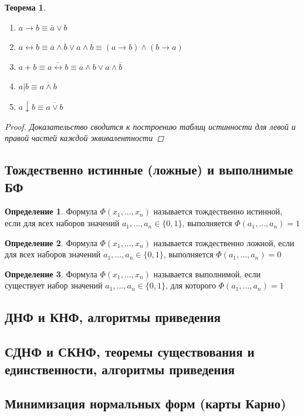 \documentclass[a4paper]{article}
\newtheorem{theorem}{Теорема}[section]
\theoremstyle{definition}
\newtheorem*{definition}{Определение}
\theoremstyle{remark}
\begin{document}
\begin{theorem}
\begin{enumerate}
			\item $a \rightarrow b \equiv \overline{a} \vee b$
			\item $a \leftrightarrow b \equiv \overline{a} \wedge \overline{b} \vee a \wedge b \equiv (a \rightarrow b) \wedge (b \rightarrow a)$
			\item $a + b \equiv \overline{a \leftrightarrow b} \equiv \overline{a} \wedge b \vee a \wedge \overline{b}$
			\item $a | b \equiv \overline{a \wedge b}$
			\item $a \downarrow b \equiv \overline{a \vee b}$
		\end{enumerate}
		\begin{proof}
			Доказательство сводится к построению таблиц истинности для левой и правой частей каждой эквивалентности
		\end{proof}
	\end{theorem}
    \subsection{Тождественно истинные (ложные) и выполнимые БФ}
	\begin{definition}
		Формула $\Phi(x_1, ..., x_n)$ называется тождественно истинной, если для всех наборов значений $a_1, ..., a_n \in \{0, 1\}$, выполняется $\Phi(a_1, ..., a_n) = 1$
	\end{definition}
	\begin{definition}
		Формула $\Phi(x_1, ..., x_n)$ называется тождественно ложной, если для всех наборов значений $a_1, ..., a_n \in \{0, 1\}$, выполняется $\Phi(a_1, ..., a_n) = 0$
	\end{definition}
	\begin{definition}
		Формула $\Phi(x_1, ..., x_n)$ называется выполнимой, если существует набор значений $a_1, ..., a_n \in \{0, 1\}$, для которого $\Phi(a_1, ..., a_n) = 1$
	\end{definition}
    \subsection{ДНФ и КНФ, алгоритмы приведения}
    \subsection{СДНФ и СКНФ, теоремы существования и единственности, алгоритмы приведения}
    \subsection{Минимизация нормальных форм (карты Карно)}
\end{document}
